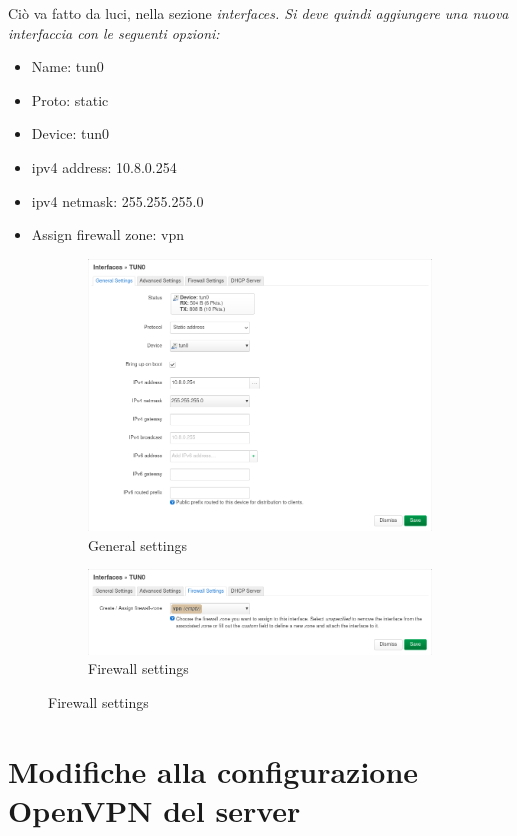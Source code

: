 Ciò va fatto da luci, nella sezione \it{interfaces}. Si deve quindi aggiungere una nuova interfaccia con le seguenti opzioni:
\begin{itemize}
    \item Name: tun0
    \item Proto: static
    \item Device: tun0
    \item ipv4 address: 10.8.0.254
    \item ipv4 netmask: 255.255.255.0
    \item Assign firewall zone: vpn
\end{itemize}

\begin{figure}[H]
    \centering
    \begin{subfigure}{0.9\linewidth}
        \centering
        \includegraphics[width=0.7\linewidth]{immagini/LuCI_int_tun0_1}
        \caption{General settings}
        \label{fig:luci-firewall-interfaces}
    \end{subfigure}

    \begin{subfigure}{0.9\linewidth}
        \centering
        \includegraphics[width=0.7\linewidth]{immagini/LuCI_int_tun0_2}
        \caption{Firewall settings}
        \label{fig:luci-firewall-interfaces1}
    \end{subfigure}
\end{figure}


\section{Modifiche alla configurazione OpenVPN del server}

